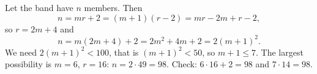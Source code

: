 Let the band have $n$ members. Then
\[
n=mr+2=(m+1)(r-2)=mr-2m+r-2,
\]
so $r=2m+4$ and
\[
n=m(2m+4)+2=2m^2+4m+2=2(m+1)^2 .
\]
We need $2(m+1)^2<100$, that is $(m+1)^2<50$, so $m+1\le7$. The largest possibility is $m=6$, $r=16$:
$n=2\cdot49=\boxed{98}$. Check: $6\cdot16+2=98$ and $7\cdot14=98$.
